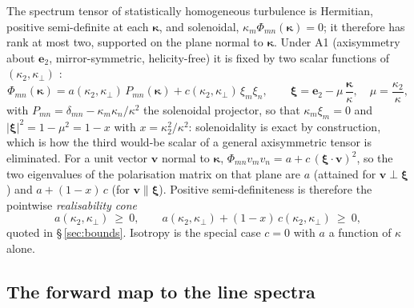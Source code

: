 \documentclass[11pt,a4paper]{article}
\begin{document}
The spectrum tensor of statistically homogeneous turbulence is Hermitian,
positive semi-definite at each $\boldsymbol{\kappa}$, and solenoidal,
$\kappa_m\Phi_{mn}(\boldsymbol{\kappa})=0$; it therefore has rank at most
two, supported on the plane normal to $\boldsymbol{\kappa}$. Under A1
(axisymmetry about $\boldsymbol{e}_2$, mirror-symmetric, helicity-free) it
is fixed by two scalar functions of $(\kappa_2,\kappa_\perp)$
\citep{Batchelor1946,ChandrasekharAxisym1950,Lindborg1995}:
\begin{equation}
  \Phi_{mn}(\boldsymbol{\kappa})
  = a(\kappa_2,\kappa_\perp)\,P_{mn}(\boldsymbol{\kappa})
  + c(\kappa_2,\kappa_\perp)\,\xi_m\xi_n,
  \qquad
  \boldsymbol{\xi} = \boldsymbol{e}_2 - \mu\,
  \frac{\boldsymbol{\kappa}}{\kappa},
  \quad \mu=\frac{\kappa_2}{\kappa},
  \label{eq:twoscalar}
\end{equation}
with $P_{mn}=\delta_{mn}-\kappa_m\kappa_n/\kappa^2$ the solenoidal
projector, so that $\kappa_m\xi_m=0$ and
$|\boldsymbol{\xi}|^2=1-\mu^2=1-x$ with $x=\kappa_2^2/\kappa^2$:
solenoidality is exact by construction, which is how the third would-be
scalar of a general axisymmetric tensor is eliminated. For a unit vector
$\boldsymbol{v}$ normal to $\boldsymbol{\kappa}$,
$\Phi_{mn}v_mv_n = a + c\,(\boldsymbol{\xi}\cdot\boldsymbol{v})^2$, so the
two eigenvalues of the polarisation matrix on that plane are $a$ (attained
for $\boldsymbol{v}\perp\boldsymbol{\xi}$) and $a+(1-x)\,c$ (for
$\boldsymbol{v}\parallel\boldsymbol{\xi}$). Positive semi-definiteness is
therefore the pointwise \emph{realisability cone}
\begin{equation}
  a(\kappa_2,\kappa_\perp)\ \ge\ 0,
  \qquad
  a(\kappa_2,\kappa_\perp) + (1-x)\,c(\kappa_2,\kappa_\perp)\ \ge\ 0 ,
  \label{eq:cone}
\end{equation}
quoted in \S\,\ref{sec:bounds}. Isotropy is the special case $c=0$ with
$a$ a function of $\kappa$ alone.

\subsection{The forward map to the line spectra}\label{app:fwdmap}
\end{document}
